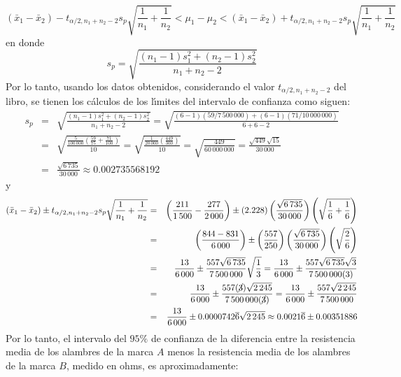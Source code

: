 \begin{solucion}
 \begin{equation*}
  \left( \bar{x}_1 - \bar{x}_2 \right) - t_{\alpha/2,n_1 + n_2 - 2} s_p \sqrt{\frac{1}{n_1} + \frac{1}{n_2}} < \mu_1 - \mu_2 < \left( \bar{x}_1 - \bar{x}_2 \right) + t_{\alpha/2,n_1 + n_2 - 2} s_p \sqrt{\frac{1}{n_1} + \frac{1}{n_2}}
 \end{equation*}
 en donde
 \begin{equation*}
  s_p = \sqrt{\frac{\left( n_1 - 1 \right)s_1^2 + \left( n_2 - 1 \right)s_2^2}{n_1 + n_2 - 2}}
 \end{equation*}
 Por lo tanto, usando los datos obtenidos, considerando el valor $t_{\alpha/2,n_1+n_2-2}$ del libro, se tienen los c\'alculos de los l\'{\i}mites del intervalo de confianza como siguen:
 \begin{eqnarray*}
  s_p & = & \sqrt{\frac{\left( n_1 - 1 \right)s_1^2 + \left( n_2 - 1 \right)s_2^2}{n_1 + n_2 - 2}} = \sqrt{\frac{(6-1)(59/7\,500\,000) + (6-1)(71/10\,000\,000)}{6+6-2}} \\
  & = & \sqrt{\frac{\frac{5}{100\,000}\left( \frac{59}{75} + \frac{71}{100} \right)}{10}} = \sqrt{ \frac{\frac{1}{20\,000}\left( \frac{449}{300} \right)}{10}} = \sqrt{\frac{449}{60\,000\,000}} = \frac{\sqrt{449}\sqrt{15}}{30\,000} \\
  & = & \frac{\sqrt{6\,735}}{30\,000} \approx 0.002735568192
 \end{eqnarray*}
 y
 \begin{eqnarray*}
  \left( \bar{x}_1 - \bar{x}_2 \right) \pm t_{\alpha/2,n_1 + n_2 - 2} s_p \sqrt{\frac{1}{n_1} + \frac{1}{n_2}} & = & \left( \frac{211}{1\,500} - \frac{277}{2\,000} \right) \pm (2.228)\left( \frac{\sqrt{6\,735}}{30\,000} \right) \left( \sqrt{\frac{1}{6} + \frac{1}{6}} \right) \\
  & = & \left( \frac{844 - 831}{6\,000} \right) \pm \left( \frac{557}{250} \right) \left( \frac{\sqrt{6\,735}}{30\,000} \right) \left( \sqrt{\frac{2}{6}} \right) \\
  & = & \frac{13}{6\,000} \pm \frac{557\sqrt{6\,735}}{7\,500\,000}\sqrt{\frac{1}{3}} = \frac{13}{6\,000} \pm \frac{557\sqrt{6\,735}\sqrt{3}}{7\,500\,000(3)} \\
  & = & \frac{13}{6\,000} \pm \frac{557(\cancel{3})\sqrt{2\,245}}{7\,500\,000(\cancel{3})} = \frac{13}{6\,000} \pm \frac{557\sqrt{2\,245}}{7\,500\,000} \\
  & = & \frac{13}{6\,000} \pm 0.0000742\overline{6}\sqrt{2\,245} \approx 0.0021\overline{6} \pm 0.00351886
 \end{eqnarray*}
 Por lo tanto, el intervalo del $95\%$ de confianza de la diferencia entre la resistencia media de los alambres de la marca $A$ menos la resistencia media de los alambres de la marca $B$, medido en ohms, es aproximadamente:

\end{solucion}
